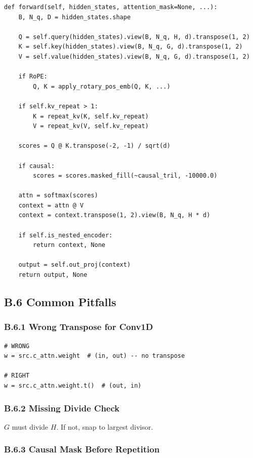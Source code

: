 \begin{lstlisting}
def forward(self, hidden_states, attention_mask=None, ...):
    B, N_q, D = hidden_states.shape
    
    Q = self.query(hidden_states).view(B, N_q, H, d).transpose(1, 2)
    K = self.key(hidden_states).view(B, N_q, G, d).transpose(1, 2)
    V = self.value(hidden_states).view(B, N_q, G, d).transpose(1, 2)
    
    if RoPE:
        Q, K = apply_rotary_pos_emb(Q, K, ...)
    
    if self.kv_repeat > 1:
        K = repeat_kv(K, self.kv_repeat)
        V = repeat_kv(V, self.kv_repeat)
    
    scores = Q @ K.transpose(-2, -1) / sqrt(d)
    
    if causal:
        scores = scores.masked_fill(~causal_tril, -10000.0)
    
    attn = softmax(scores)
    context = attn @ V
    context = context.transpose(1, 2).view(B, N_q, H * d)
    
    if self.is_nested_encoder:
        return context, None
    
    output = self.out_proj(context)
    return output, None
\end{lstlisting}

\subsection{B.6 Common Pitfalls}

\subsubsection{B.6.1 Wrong Transpose for Conv1D}

\begin{lstlisting}
# WRONG
w = src.c_attn.weight  # (in, out) -- no transpose

# RIGHT
w = src.c_attn.weight.t()  # (out, in)
\end{lstlisting}

\subsubsection{B.6.2 Missing Divide Check}

$G$ must divide $H$. If not, snap to largest divisor.

\subsubsection{B.6.3 Causal Mask Before Repetition}


